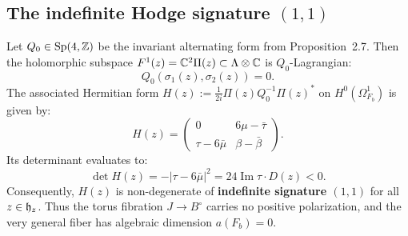 \subsection{The indefinite Hodge signature $(1,1)$}

\begin{theorem}\label{thm:hodge-signature}
Let $Q_0 \in \mathrm{Sp}(4, \mathbb{Z})$ be the invariant alternating form from Proposition~2.7.
Then the holomorphic subspace $F^1(z) = \mathbb{C}^2 \Pi(z) \subset \Lambda \otimes \mathbb{C}$ is $Q_0$-Lagrangian:
\[
Q_0(\sigma_1(z), \sigma_2(z)) = 0.
\]
The associated Hermitian form $H(z) := \frac{1}{2i} \Pi(z) Q_0^{-1} \Pi(z)^*$ on $H^0(\Omega_{F_b}^1)$ is given by:
\[
H(z) = \begin{pmatrix} 0 & 6\mu - \bar\tau \\ \tau - 6\bar\mu & \beta - \bar\beta \end{pmatrix}.
\]
Its determinant evaluates to:
\[
\det H(z) = -|\tau - 6\bar\mu|^2 = 24 \operatorname{Im}\tau \cdot D(z) < 0.
\]
Consequently, $H(z)$ is non-degenerate of \textbf{indefinite signature $(1,1)$} for all $z \in \mathfrak{h}_z$.
Thus the torus fibration $J \to B^\circ$ carries no positive polarization, and the very general fiber has algebraic dimension $a(F_b) = 0$.
\end{theorem}

